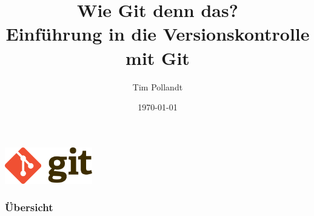 \documentclass[
	ngerman, %
	aspectratio=169, %
	color={accentcolor=8b},
	colorframetitle=true,%
	authorontitle=true
]{tudabeamer}
\begin{document}
\title[Git-Workshop]{Wie Git denn das?\\Einführung in die Versionskontrolle mit Git}
\subtitle{Tim Pollandt}

\author[]{}


\date{\today}
 
\begin{titlepage}
	
	\begin{center}
  	\includegraphics[height=60px]{git_logo}
  	\vspace{1.5cm}
	\end{center} 
\end{titlepage}

\begin{frame}
\frametitle{Übersicht}
\tableofcontents
\end{frame}
\end{document}
